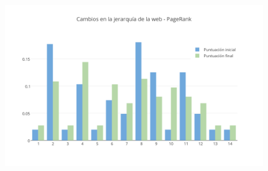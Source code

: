 \documentclass[a4paper]{article}
\begin{document}
\begin{figure}[h!]
  \begin{center}
	\includegraphics[scale=0.66]{imagenes/cambiospagerank.png}
	\caption{}
	\label{cambiospagerank}
  \end{center}
\end{figure}

\newpage
\end{document}
